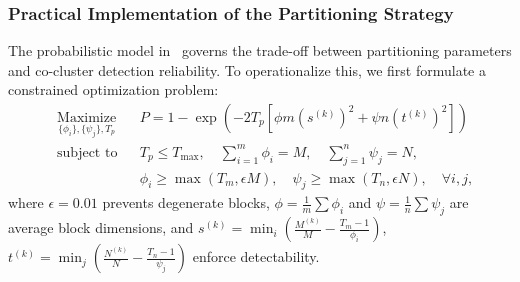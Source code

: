 \documentclass[journal]{IEEEtran}
\theoremstyle{definition}
\theoremstyle{remark} %
\begin{document}
\subsubsection{Practical Implementation of the Partitioning Strategy}
\label{subsec:practical-implementation}
The probabilistic model in~ governs the trade-off between partitioning parameters and co-cluster detection reliability. To operationalize this, we first formulate a constrained optimization problem:
\begin{equation}
    \begin{aligned}
         & \underset{\{\phi_i\}, \{\psi_j\}, T_p}{\text{Maximize}}
         &                                                         & P = 1 - \exp\left( -2 T_p \left[ \phi m (s^{(k)})^2 + \psi n (t^{(k)})^2 \right] \right)                                                                                                  \\
         & \text{subject to}
         &                                                         & T_p \leq T_{\text{max}}, \quad \sum_{i=1}^m \phi_i = M, \quad \sum_{j=1}^n \psi_j = N,                                                                                                    \\
         &                                                         &                                                                                          & \phi_i \geq \max(T_m, \epsilon M), \quad \psi_j \geq \max(T_n, \epsilon N), \quad \forall i,j,
    \end{aligned}
\end{equation}
where $\epsilon = 0.01$ prevents degenerate blocks, $\phi = \frac{1}{m}\sum \phi_i$ and $\psi = \frac{1}{n}\sum \psi_j$ are average block dimensions, and $s^{(k)} = \min_i \left( \frac{M^{(k)}}{M} - \frac{T_m-1}{\phi_i} \right)$, $t^{(k)} = \min_j \left( \frac{N^{(k)}}{N} - \frac{T_n-1}{\psi_j} \right)$ enforce detectability.
\end{document}
